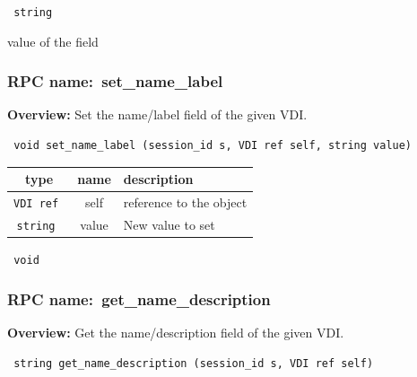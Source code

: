\vspace{0.3cm}

{\tt 
string
}


value of the field
\vspace{0.3cm}
\vspace{0.3cm}
\vspace{0.3cm}
\subsubsection{RPC name:~set\_name\_label}

{\bf Overview:} 
Set the name/label field of the given VDI.

\begin{verbatim} void set_name_label (session_id s, VDI ref self, string value)\end{verbatim}



 
\vspace{0.3cm}
\begin{tabular}{|c|c|p{7cm}|}
 \hline
{\bf type} & {\bf name} & {\bf description} \\ \hline
{\tt VDI ref } & self & reference to the object \\ \hline 

{\tt string } & value & New value to set \\ \hline 

\end{tabular}

\vspace{0.3cm}

{\tt 
void
}



\vspace{0.3cm}
\vspace{0.3cm}
\vspace{0.3cm}
\subsubsection{RPC name:~get\_name\_description}

{\bf Overview:} 
Get the name/description field of the given VDI.

\begin{verbatim} string get_name_description (session_id s, VDI ref self)\end{verbatim}


